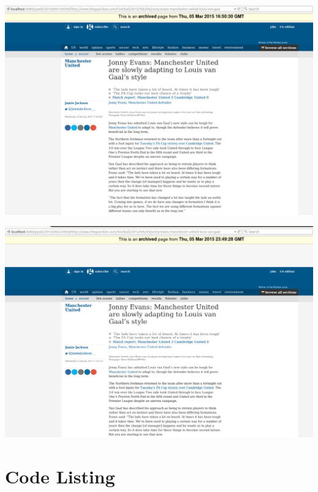 \begin{minipage}{\linewidth}
	\includegraphics[scale=0.55]{figures/playback/pywb_89_webrecorder.PNG}
	\label{sizeURI3}
\end{minipage}
\newpage
\begin{minipage}{\linewidth}
	\includegraphics[scale=0.55]{figures/playback/pywb_89_wget.PNG}
	\label{sizeURI3}
\end{minipage}

\newpage
\section{Code Listing}
